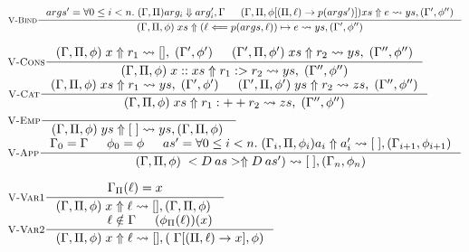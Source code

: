 \begin{figure}\footnotesize
\begin{center}
    $\inference
        [\ValidateAssignment]
        { args' = \forall 0 \leq i < n. \; (\env, \pathvar) arg_i \gens arg'_i, \env
        & (\env, \pathvar, \predtrack [(\pathvar, \lab) \rightarrow p(args')]) xs \gennedby e \gennedarrow ys, (\env', \predtrack'')}
        {\valinp xs \gennedby (\lab \Longleftarrow p(args, \lab)) \mapsto e \gennedarrow ys, (\env', \predtrack'')}$

    $\inference
        [\ValidateCons]
        {\valinp x \gennedby r_1 \gennedarrow [], \valout & \valdinp xs \gennedby r_2 \gennedarrow ys, \dvalout}
        {\valinp x \ccons xs \gennedby r_1 \cons r_2 \gennedarrow ys, \dvalout}$
    $\inference
        [\ValidateConcat]
        {\valinp xs \gennedby r_1 \gennedarrow ys, \valout & \valdinp ys \gennedby r_2 \gennedarrow zs, \dvalout}
        {\valinp xs  \gennedby r_1 \concat r_2 \gennedarrow zs, \dvalout}$
    $\inference
        [\ValidateEmpty]
        {}
        {\valinp ys \gennedby \nil \gennedarrow ys, \valinp}$
    $\inference
        [\ValidateApplication]
        {\env_0 = \env & \predtrack_0 = \predtrack
            & as' = \forall 0 \leq i < n. \; (\env_{i}, \pathvar, \predtrack_{i}) a_i \gennedby a'_i \gennedarrow \nil, (\env_{i + 1}, \predtrack_{i + 1})}
         {\valinp <\dc \; as> \gennedby \dc(as') \gennedarrow \nil, (\env_n,\predtrack_n)}$

    $\inference
        [\ValidateVarOne]
        {\envget{\lab} = x}
        {\valinp x \gennedby \lab \gennedarrow [], \valinp}$
    $\inference
        [\ValidateVarTwo]
        {\envhasnt{\lab} & (\predtrack_\pathvar(\lab))(x)}
        {\valinp x \gennedby \lab \gennedarrow [], (\outw{\lab}{x}, \predtrack)}$


\end{center}
\end{figure}
